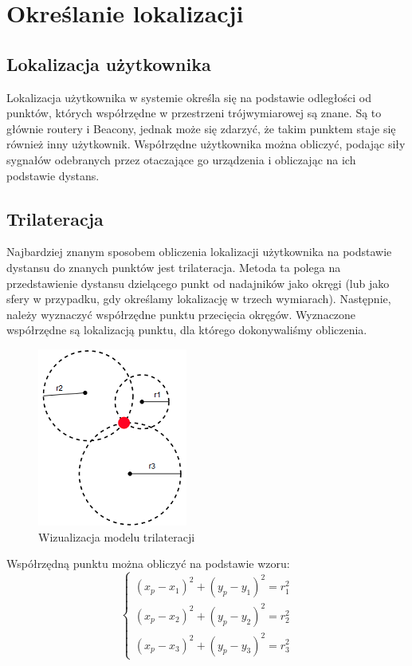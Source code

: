 \chapter{Określanie lokalizacji}
\label{cha:lokalizacja}
\section{Lokalizacja użytkownika}
Lokalizacja użytkownika w systemie określa się na podstawie odległości od punktów, których współrzędne w przestrzeni trójwymiarowej są znane. Są to głównie routery i Beacony, jednak może się zdarzyć, że takim punktem staje się również inny użytkownik. Współrzędne użytkownika można obliczyć, podając siły sygnałów odebranych przez otaczające go urządzenia i obliczając na ich podstawie dystans.
\section{Trilateracja}
Najbardziej znanym sposobem obliczenia lokalizacji użytkownika na podstawie dystansu do znanych punktów jest trilateracja. Metoda ta polega na przedstawienie dystansu dzielącego punkt od nadajników jako okręgi (lub jako sfery w przypadku, gdy określamy lokalizację w trzech wymiarach). Następnie, należy wyznaczyć współrzędne punktu przecięcia okręgów. Wyznaczone współrzędne są lokalizacją punktu, dla którego dokonywaliśmy obliczenia.
\begin{figure}[H]			
	\centering
	\caption{Wizualizacja modelu trilateracji}
	\includegraphics{trilateracja}
\end{figure}
Współrzędną punktu można obliczyć na podstawie wzoru:
\begin{equation}
\left\{
\begin{array}{l}
(x_p-x_1)^2 + (y_p - y_1)^2 = r_1^2\\
(x_p-x_2)^2 + (y_p - y_2)^2 = r_2^2\\
(x_p-x_3)^2 + (y_p - y_3)^2 = r_3^2
\end{array}
\right.
\end{equation}
